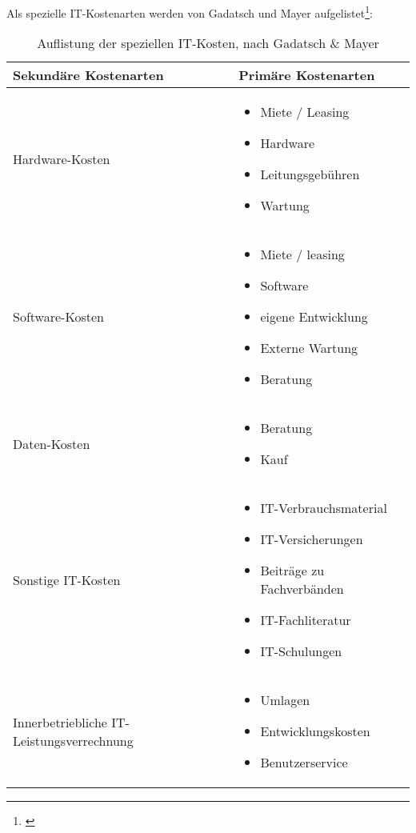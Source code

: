\clearpage 

Als spezielle IT-Kostenarten werden von Gadatsch und Mayer aufgelistet\footnote{\autocite[349]{gadatsch_masterkurs_2014}}:

\begin{table}[h!]
	\begin{tabularx}{\textwidth}{|l|X|}
		\hline \textbf{Sekundäre Kostenarten}  &  \textbf{Primäre Kostenarten}\\
		\hline Hardware-Kosten &
		\begin{itemize}
			\item Miete / Leasing
			\item Hardware
			\item Leitungsgebühren
			\item Wartung
		\end{itemize} \\ 
		\hline Software-Kosten  & 
		\begin{itemize}
			\item Miete / leasing
			\item Software
			\item eigene Entwicklung
			\item Externe Wartung
			\item Beratung
		\end{itemize} \\ 
	\hline Daten-Kosten &
	\begin{itemize}
		\item Beratung
		\item Kauf
	\end{itemize}  \\
	\hline Sonstige IT-Kosten &
		\begin{itemize}
			\item IT-Verbrauchsmaterial
			\item IT-Versicherungen
			\item Beiträge zu Fachverbänden
			\item IT-Fachliteratur
			\item IT-Schulungen
		\end{itemize}\\
	\hline Innerbetriebliche IT-Leistungsverrechnung & 
	\begin{itemize}
		\item Umlagen
		\item Entwicklungskosten
		\item Benutzerservice
	\end{itemize}\\
	\hline
\end{tabularx}
\caption{Auflistung der speziellen IT-Kosten, nach Gadatsch \& Mayer}
\label{tab_auflistung_spezielle_IT_Kosten}
\end{table}

